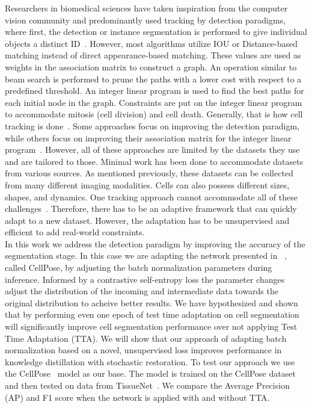 Researchers in biomedical sciences have taken inspiration from the computer vision community and predominantly used tracking by detection paradigms, where first, the detection or instance segmentation is performed to give individual objects a distinct ID~\cite{bragantini2024ultrack,ershov2022trackmate}. However, most algorithms utilize IOU or Distance-based matching instead of direct appearance-based matching. These values are used as weights in the association matrix to construct a graph. An operation similar to beam search is performed to prune the paths with a lower cost with respect to a predefined threshold.  An integer linear program is used to find the best paths for each initial node in the graph. Constraints are put on the integer linear program to accommodate mitosis (cell division) and cell death. Generally, that is how cell tracking is done~\cite{mavska2023cell}. Some approaches focus on improving the detection paradigm, while others focus on improving their association matrix for the integer linear program~\cite{mavska2023cell}. However, all of these approaches are limited by the datasets they use and are tailored to those. Minimal work has been done to accommodate datasets from various sources. As mentioned previously, these datasets can be collected from many different imaging modalities. Cells can also possess different sizes, shapes, and dynamics. One tracking approach cannot accommodate all of these challenges~\cite{chen2024cmtt}. Therefore, there has to be an adaptive framework that can quickly adapt to a new dataset. However, the adaptation has to be unsupervised and efficient to add real-world constraints.\\

In this work we address the detection paradigm by improving the accuracy of the segmentation stage.  In this case we are adapting the network presented in ~\cite{stringer2021cellpose}, called CellPose, by adjusting the batch normalization parameters during inference.  Informed by a contrastive self-entropy loss the parameter changes adjust the distribution of the incoming and intermediate data towards the original distribution to acheive better results. We have hypothesized and shown that by performing even one epoch of test time adaptation on cell segmentation will significantly improve cell segmentation performance over not applying Test Time Adaptation (TTA). We will show that our approach of adapting batch normalization based on a novel, unsupervised loss improves performance in knowledge distillation with stochastic restoration. To test our approach we use the CellPose~\cite{keaton2023celltranspose} model as our base. The model is trained on the CellPose dataset~\cite{stringer2021cellpose} and then tested on data from TissueNet~\cite{TissueNet,TN2,TN3,TN4}. We compare the Average Precision (AP) and F1 score when the network is applied with and without TTA. 


